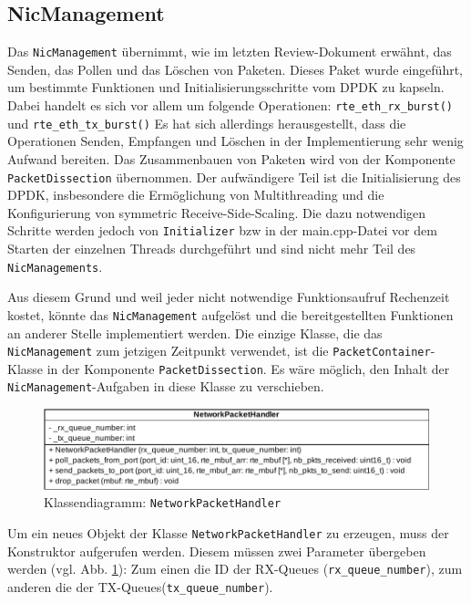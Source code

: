 \documentclass[../review_3.tex]{subfiles}
\begin{document}
\subsection{NicManagement}
Das \texttt{NicManagement} übernimmt, wie im letzten Review-Dokument erwähnt, das Senden, das Pollen und das Löschen von Paketen. Dieses Paket wurde eingeführt, um bestimmte Funktionen und Initialisierungsschritte vom DPDK zu kapseln. Dabei handelt es sich vor allem um folgende Operationen: \texttt{rte\_eth\_rx\_burst()} und \texttt{rte\_eth\_tx\_burst()} Es hat sich allerdings herausgestellt, dass die Operationen \glqq Senden\grqq{}, \glqq Empfangen\grqq{} und \glqq Löschen\grqq{} in der Implementierung sehr wenig Aufwand bereiten. Das Zusammenbauen von Paketen wird von der Komponente \texttt{PacketDissection} übernommen. Der aufwändigere Teil ist die Initialisierung des DPDK, insbesondere die Ermöglichung von Multithreading und die Konfigurierung von symmetric Receive-Side-Scaling. Die dazu notwendigen Schritte werden jedoch von \texttt{Initializer} bzw in der main.cpp-Datei vor dem Starten der einzelnen Threads durchgeführt und sind nicht mehr Teil des \texttt{NicManagements}.

Aus diesem Grund und weil jeder nicht notwendige Funktionsaufruf Rechenzeit kostet, könnte das \texttt{NicManagement} aufgelöst und die bereitgestellten Funktionen an anderer Stelle implementiert werden. Die einzige Klasse, die das \texttt{NicManagement} zum jetzigen Zeitpunkt verwendet, ist die \texttt{PacketContainer}-Klasse in der Komponente \texttt{PacketDissection}. Es wäre möglich, den Inhalt der \texttt{NicManagement}-Aufgaben in diese Klasse zu verschieben.

\begin{figure}[h]
    \centering
    \includegraphics[width=\linewidth]{img/NetworkPacketHandler.pdf}
    \caption{Klassendiagramm: \texttt{NetworkPacketHandler}}
    \label{nph}
\end{figure}

Um ein neues Objekt der Klasse \texttt{NetworkPacketHandler} zu erzeugen, muss der Konstruktor aufgerufen werden. Diesem müssen zwei Parameter übergeben werden (vgl. Abb. \ref{nph}): Zum einen die ID der RX-Queues (\texttt{rx\_queue\_number}), zum anderen die der TX-Queues(\texttt{tx\_queue\_number}).
\end{document}
